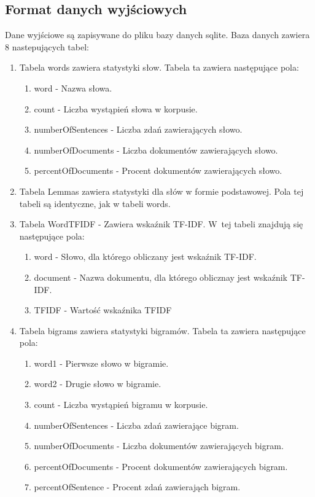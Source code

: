 \documentclass[11pt]{article}
\begin{document}
\subsection{Format danych wyjściowych}
Dane wyjściowe są zapisywane do pliku bazy danych sqlite.
Baza danych zawiera 8 nastepujących tabel:
\begin{enumerate}
 \item Tabela words zawiera statystyki słow. Tabela ta zawiera następujące pola:
  \begin{enumerate}
    \item word - Nazwa słowa.
    \item count - Liczba wystąpień słowa w korpusie.
    \item numberOfSentences - Liczba zdań zawierających słowo.
    \item numberOfDocuments - Liczba dokumentów zawierających słowo.
    \item percentOfDocuments - Procent dokumentów zawierających słowo.
  \end{enumerate}
  \item Tabela Lemmas zawiera statystyki dla słów w formie podstawowej. Pola tej tabeli są identyczne, jak w tabeli words.
  \item Tabela WordTFIDF - Zawiera wskaźnik TF-IDF. W~tej tabeli znajdują się następujące pola:
  \begin{enumerate}
    \item word - Słowo, dla którego obliczany jest wskaźnik TF-IDF.
    \item  document - Nazwa dokumentu, dla którego oblicznay jest wskaźnik TF-IDF.
    \item TFIDF - Wartość wskaźnika TFIDF
  \end{enumerate}
  \item Tabela bigrams zawiera statystyki bigramów. Tabela ta zawiera następujące pola:
  \begin{enumerate}
     \item word1 - Pierwsze słowo w bigramie.
     \item word2 - Drugie słowo w bigramie.
     \item count - Liczba wystąpień bigramu w korpusie.
     \item numberOfSentences  - Liczba zdań zawierające bigram.
     \item numberOfDocuments - Liczba dokumentów zawierających bigram.
     \item percentOfDocuments  - Procent dokumentów zawierających bigram.
     \item percentOfSentence  -  Procent zdań zawierająch bigram.

\end{enumerate}
\end{enumerate}
\end{document}
